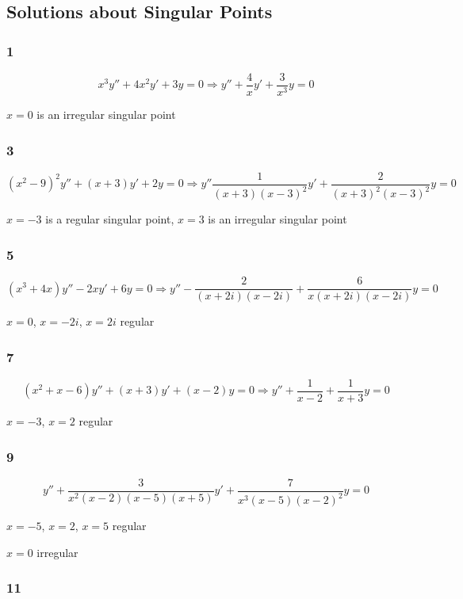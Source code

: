 \documentclass{article}
\begin{document}
\subsection{Solutions about Singular Points}

\subsubsection{1}

\[x^3 y'' + 4 x^2 y' + 3 y = 0 \Rightarrow y'' + \frac{4}{x} y' + \frac{3}{x^3} y = 0\]

$x = 0$ is an irregular singular point

\subsubsection{3}

\[(x^2 - 9)^2 y'' + (x + 3) y' + 2 y = 0 \Rightarrow y'' \frac{1}{(x + 3) (x - 3)^2} y' + \frac{2}{(x + 3)^2 (x - 3)^2} y = 0\]

$x = -3$ is a regular singular point, $x = 3$ is an irregular singular point

\subsubsection{5}

\[(x^3 + 4 x) y'' - 2 x y' + 6 y = 0 \Rightarrow y'' - \frac{2}{(x + 2 i) (x - 2 i)} + \frac{6}{x (x + 2 i) (x - 2 i)} y = 0\]

$x = 0$, $x = -2 i$, $x = 2 i$ regular

\subsubsection{7}

\[(x^2 + x - 6) y'' + (x + 3) y' + (x - 2) y = 0 \Rightarrow y'' + \frac{1}{x - 2} + \frac{1}{x + 3} y = 0\]

$x = -3$, $x = 2$ regular

\subsubsection{9}

\[y'' + \frac{3}{x^2 (x - 2) (x - 5) (x + 5)} y' + \frac{7}{x^3 (x - 5) (x - 2)^2} y = 0\]

$x = -5$, $x = 2$, $x = 5$ regular

$x = 0$ irregular

\subsubsection{11}
\end{document}
